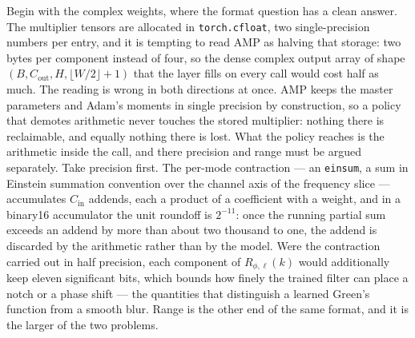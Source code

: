 Begin with the complex weights, where the format question has a clean answer. The multiplier
tensors are allocated in \texttt{torch.cfloat}, two single-precision numbers per entry, and it
is tempting to read AMP as halving that storage: two bytes per component instead of four, so
the dense complex output array of shape $(B, C_{\mathrm{out}}, H, \lfloor W/2 \rfloor + 1)$
that the layer fills on every call would cost half as much. The reading is wrong in both
directions at once. AMP keeps the master parameters and Adam's moments in single precision by
construction, so a policy that demotes arithmetic never touches the stored multiplier: nothing
there is reclaimable, and equally nothing there is lost. What the policy reaches is the
arithmetic inside the call, and there precision and range must be argued separately. Take
precision first. The per-mode contraction --- an \texttt{einsum}, a sum in Einstein summation
convention over the channel
axis of the frequency slice --- accumulates $C_{\mathrm{in}}$ addends, each a product of a
coefficient with a weight, and in a binary16 accumulator the unit roundoff is $2^{-11}$: once
the running partial sum exceeds an addend by more than about two thousand to one, the addend
is discarded by the arithmetic rather than by the model. Were the contraction carried out in
half precision, each component of $R_{\phi,\ell}(k)$ would additionally keep eleven
significant bits, which bounds how finely the trained filter can place a notch or a phase
shift --- the quantities that distinguish a learned Green's function from a smooth blur.
Range is the other end of the same format, and it is the larger of the two problems.

